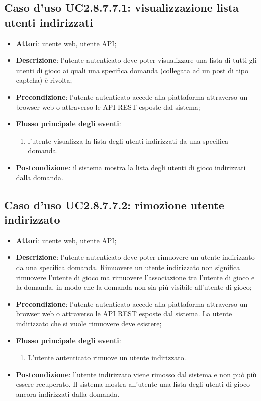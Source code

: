 \subsection{Caso d'uso UC2.8.7.7.1: visualizzazione lista utenti indirizzati}
\begin{itemize}
\item \textbf{Attori}: utente web, utente API;
\item \textbf{Descrizione}: l'utente autenticato deve poter visualizzare una lista di tutti gli utenti di gioco ai quali una specifica domanda (collegata ad un post di tipo captcha) è rivolta; 
      \item \textbf{Precondizione}: l'utente autenticato accede alla piattaforma attraverso un browser web o attraverso le API REST esposte dal sistema;

        \item \textbf{Flusso principale degli eventi}:
          \begin{enumerate}
          \item l'utente visualizza la lista degli utenti indirizzati da una specifica domanda.

      \end{enumerate}
    \item \textbf{Postcondizione}: il sistema mostra la lista degli utenti di gioco indirizzati dalla domanda.
  \end{itemize}
\hypertarget{UC2.8.7.7.2}{}
\subsection{Caso d'uso UC2.8.7.7.2: rimozione utente indirizzato}
\begin{itemize}
\item \textbf{Attori}: utente web, utente API;
\item \textbf{Descrizione}: l'utente autenticato deve poter rimuovere un utente indirizzato da una specifica domanda. Rimuovere un utente indirizzato non significa rimuovere l'utente di gioco ma rimuovere l'associazione tra l'utente di gioco e la domanda, in modo che la domanda non sia più visibile all'utente di gioco; 
      \item \textbf{Precondizione}: l'utente autenticato accede alla piattaforma attraverso un browser web o attraverso le API REST esposte dal sistema. La utente indirizzato che si vuole rimuovere deve esistere;

        \item \textbf{Flusso principale degli eventi}:
          \begin{enumerate}
          \item L'utente autenticato rimuove un utente indirizzato.

      \end{enumerate}
    \item \textbf{Postcondizione}: l'utente indirizzato viene rimosso dal sistema e non può più essere recuperato. Il sistema mostra all'utente una lista degli utenti di gioco ancora indirizzati dalla domanda.
  \end{itemize}
\hypertarget{UC2.8.7.8}{}
